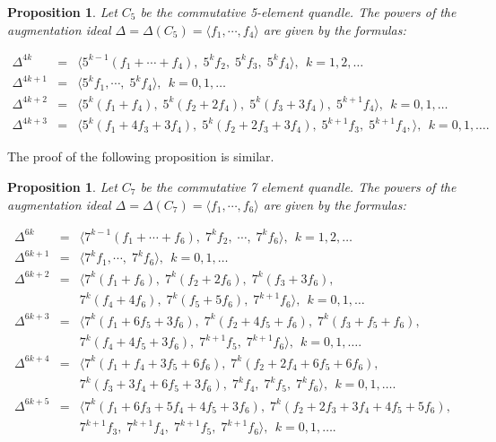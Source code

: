\documentclass[12pt]{amsart}
\newtheorem{pro}[thm]{Proposition}
\theoremstyle{definition}
\theoremstyle{remark}
\begin{document}
\begin{pro}\label{CommutativeZ5}
Let  $C_5$ be the commutative 5-element quandle.  The powers of the  augmentation ideal $\Delta = \Delta(C_5) =\langle f_1, \cdots, f_4 \rangle$ are given by the formulas:

\begin{eqnarray}
\Delta^{4k} &=& \langle  5^{k-1}(f_1+ \cdots +f_4), \; 5^kf_2, \; 5^kf_3, \; 5^kf_4   \nonumber \rangle,~~k = 1, 2, \ldots \\
\Delta^{4k+1} &=& \langle  5^kf_1, \cdots, \; 5^kf_4   \nonumber \rangle,~~k = 0, 1, \ldots \\
\Delta^{4k+2} &=& \langle  5^k(f_1+f_4), \; 5^k(f_2+2f_4), \; 5^k(f_3+3f_4),  \; 5^{k+1}f_4   \nonumber \rangle,~~k = 0, 1, \ldots \\
\Delta^{4k+3} &=& \langle  5^k(f_1+4f_3+3f_4), \;  5^k(f_2+2f_3+3f_4),\; 5^{k+1}f_3, \; 5^{k+1}f_4,  \nonumber \rangle,~~k = 0, 1, \ldots.
\end{eqnarray}
\end{pro} 

The proof of the following proposition is similar.


\begin{pro}\label{CommutativeZ7}
Let  $C_7$ be the commutative 7 element quandle.  The powers of the  augmentation ideal $\Delta=\Delta(C_7) =\langle f_1, \cdots, f_6 \rangle$ are given by the formulas:

\begin{eqnarray}
\Delta^{6k} &=& \langle  7^{k-1}(f_1+ \cdots +f_6), \; 7^kf_2, \; \cdots, \; 7^kf_6   \nonumber \rangle,~~k = 1, 2, \ldots\\
\Delta^{6k+1} &=& \langle  7^kf_1, \cdots, \; 7^kf_6   \nonumber \rangle,~~k = 0, 1, \ldots\\
\Delta^{6k+2} &=& \langle  7^{k}(f_1+f_6), \; 7^{k}(f_2+2f_6), \; 7^{k}(f_3+3f_6), \nonumber\\
&& 7^{k}(f_4+4f_6), \; 7^{k}(f_5+5f_6),   \; 7^{k+1}f_6   \nonumber \rangle,~~k = 0, 1, \ldots\\
\Delta^{6k+3} &=& \langle  7^k(f_1+6f_5+3f_6), \;  7^k(f_2+4f_5+f_6),\; 7^k(f_3+f_5+f_6), \nonumber \\
&& 7^k(f_4+4f_5+3f_6),\; 7^{k+1}f_5, \; 7^{k+1}f_6  \nonumber \rangle,~~k = 0, 1, \ldots.\\
\Delta^{6k+4} &=& \langle  7^k(f_1+f_4+3f_5+6f_6), \; 7^k(f_2+2f_4+6f_5+6f_6),  \nonumber \\
&& 7^k(f_3+3f_4+6f_5+3f_6),  \; 7^kf_4, \; 7^kf_5, \; 7^kf_6   \nonumber \rangle,~~k = 0, 1, \ldots.\\
\Delta^{6k+5} &=& \langle  7^k(f_1+6f_3+5f_4+4f_5+3f_6), \;  7^k(f_2+2f_3+3f_4+4f_5+5f_6), \nonumber \\
&& 7^{k+1}f_3, \; 7^{k+1}f_4,  \; 7^{k+1}f_5,  \; 7^{k+1}f_6   \nonumber \rangle,~~k = 0, 1, \ldots.
\end{eqnarray}

\end{pro} 
\end{document}

